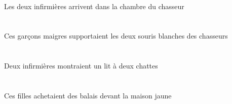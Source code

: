 \begin{exe}
\DEFDuAbsG{}   \infirmiereBDuAbsG{}    \DEFSgOblG{}    \DEFSgOblG{}   \chasseurCSgOblG{}   \DEG{}   \chambreBSgOblG{}   \DANSG{}  \arriverViPrsBDuG{}\\
Les deux infirmières arrivent dans la chambre du chasseur
\ex\glll
\DEMPlErg{}   \maigreBPl{}   \garconBPlErg{}   \DEFDuAbs{}    \DEFPlObl{}   \chasseurCPlObl{}   \DE{}   \blancADu{}   \sourisADuAbs{}  \supporterVtPstADu{}\\
\DEMPlErgP{}   \maigreBPlP{}   \garconBPlErgP{}   \DEFDuAbsP{}    \DEFPlOblP{}   \chasseurCPlOblP{}   \DEP{}   \blancADuP{}   \sourisADuAbsP{}  \supporterVtPstADuP{}\\
\DEMPlErgG{}   \maigreBPlG{}   \garconBPlErgG{}   \DEFDuAbsG{}    \DEFPlOblG{}   \chasseurCPlOblG{}   \DEG{}   \blancADuG{}   \sourisADuAbsG{}  \supporterVtPstADuG{}\\
Ces garçons maigres supportaient les deux souris blanches des chasseurs
\ex\glll
\INDDuErg{}   \infirmiereBDuErg{}    \INDDuDat{}   \chatDDuDat{}   \INDSgAbs{}   \litDSgAbs{}  \montrerVdPstDSg{}\\
\INDDuErgP{}   \infirmiereBDuErgP{}    \INDDuDatP{}   \chatDDuDatP{}   \INDSgAbsP{}   \litDSgAbsP{}  \montrerVdPstDSgP{}\\
\INDDuErgG{}   \infirmiereBDuErgG{}    \INDDuDatG{}   \chatDDuDatG{}   \INDSgAbsG{}   \litDSgAbsG{}  \montrerVdPstDSgG{}\\
Deux infirmières montraient un lit à deux chattes
\ex\glll
\DEFSgObl{}   \jauneDSg{}   \maisonDSgObl{}   \DEVANT{}   \DEMPlErg{}   \filleCPlErg{}   \INDPlAbs{}   \balaiCPlAbs{}  \acheterVtPstCPl{}\\
\DEFSgOblP{}   \jauneDSgP{}   \maisonDSgOblP{}   \DEVANTP{}   \DEMPlErgP{}   \filleCPlErgP{}   \INDPlAbsP{}   \balaiCPlAbsP{}  \acheterVtPstCPlP{}\\
\DEFSgOblG{}   \jauneDSgG{}   \maisonDSgOblG{}   \DEVANTG{}   \DEMPlErgG{}   \filleCPlErgG{}   \INDPlAbsG{}   \balaiCPlAbsG{}  \acheterVtPstCPlG{}\\
Ces filles achetaient des balais devant la maison jaune
\ex\glll
\INDSgErg{}   \NicoleDSgErg{}    \DEFPlDat{}    \DEFPlObl{}   \infirmiereBPlObl{}   \DE{}   \filleCPlDat{}   \DEFSgAbs{}    \DEFSgObl{}   \maisonDSgObl{}   \DE{}   \cuisineCSgAbs{}  \montrerVdPrsCSg{}\\
\INDSgErgP{}   \NicoleDSgErgP{}    \DEFPlDatP{}    \DEFPlOblP{}   \infirmiereBPlOblP{}   \DEP{}   \filleCPlDatP{}   \DEFSgAbsP{}    \DEFSgOblP{}   \maisonDSgOblP{}   \DEP{}   \cuisineCSgAbsP{}  \montrerVdPrsCSgP{}\\

\end{exe}
